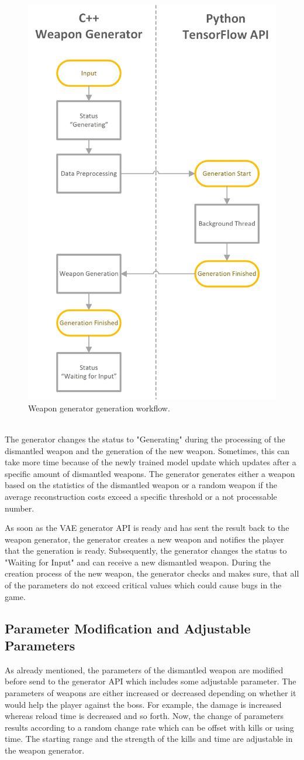 \documentclass[MGS,Master,english]{twbook}%
\begin{document}
\begin{figure}[!ht]
	\centering
	\includegraphics[width=0.5\linewidth]{PICs/WeaponGeneratorWorkflow_Generation}
	\caption{Weapon generator generation workflow.} \label{figure::weaponGen::gen}
\end{figure}\\
The generator changes the status to "Generating" during the processing of the dismantled weapon and the generation of the new weapon. Sometimes, this can take more time because of the newly trained model update which updates after a specific amount of dismantled weapons. The generator generates either a weapon based on the statistics of the dismantled weapon or a random weapon if the average reconstruction costs exceed a specific threshold or a not processable number.

As soon as the VAE generator API is ready and has sent the result back to the weapon generator, the generator creates a new weapon and notifies the player that the generation is ready. Subsequently, the generator changes the status to "Waiting for Input" and can receive a new dismantled weapon. During the creation process of the new weapon, the generator checks and makes sure, that all of the parameters do not exceed critical values which could cause bugs in the game. 

\subsection{Parameter Modification and Adjustable Parameters}
As already mentioned, the parameters of the dismantled weapon are modified before send to the generator API which includes some adjustable parameter. The parameters of weapons are either increased or decreased depending on whether it would help the player against the boss. For example, the damage is increased whereas reload time is decreased and so forth. Now, the change of parameters results according to a random change rate which can be offset with kills or using time. The starting range and the strength of the kills and time are adjustable in the weapon generator. 
\end{document}
